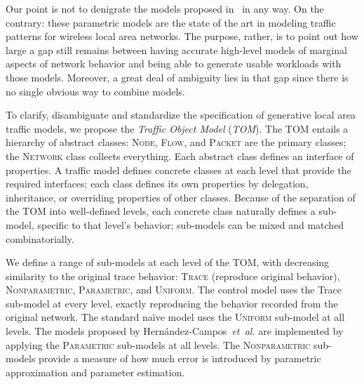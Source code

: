 \documentclass[conference]{IEEEtran}
\newcommand{\caps}[1]{{\small{#1}}}
\newcommand{\FHC}{Hern\'andez-Campos~\textit{et~al.}}
\newcommand{\class}[1]{\textsc{\small{#1}}}
\begin{document}
Our point is not to denigrate the models proposed in~\cite{Hernandez06:wlan-traffic} in any way. On the contrary: these parametric models are the state of the art in modeling traffic patterns for wireless local area networks. The purpose, rather, is to point out how large a gap still remains between having accurate high-level models of marginal aspects of network behavior and being able to generate usable workloads with those models. Moreover, a great deal of ambiguity lies in that gap since there is no single obvious way to combine models.

To clarify, disambiguate and standardize the specification of generative local area traffic models, we propose the \textit{Traffic Object Model} (\textit{\caps{TOM}}). The \caps{TOM} entails a hierarchy of abstract classes: \class{Node}, \class{Flow}, and \class{Packet} are the primary classes; the \class{Network} class collects everything. Each abstract class defines an interface of properties. A traffic model defines concrete classes at each level that provide the required interfaces; each class defines its own properties by delegation, inheritance, or overriding properties of other classes. Because of the separation of the \caps{TOM} into well-defined levels, each concrete class naturally defines a sub-model, specific to that level's behavior; sub-models can be mixed and matched combinatorially.

We define a range of sub-models at each level of the \caps{TOM}, with decreasing similarity to the original trace behavior: \class{Trace} (reproduce original behavior), \class{Nonparametric}, \class{Parametric}, and \class{Uniform}. The control model uses the Trace sub-model at every level, exactly reproducing the behavior recorded from the original network. The standard na\"ive model uses the \class{Uniform} sub-model at all levels. The models proposed by {\FHC} are implemented by applying the \class{Parametric} sub-models at all levels. The \class{Nonparametric} sub-models provide a measure of how much error is introduced by parametric approximation and parameter estimation.


\end{document}
